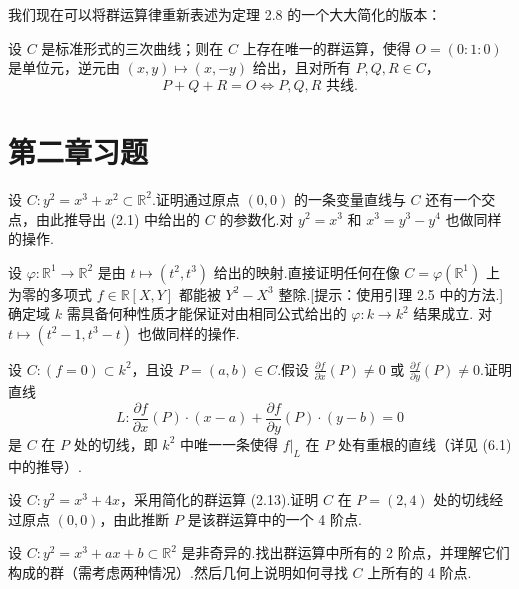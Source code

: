 我们现在可以将群运算律重新表述为定理 2.8 的一个大大简化的版本：

\begin{theorem}
设 \(C\) 是标准形式的三次曲线；则在 \(C\) 上存在唯一的群运算，使得 \(O = (0:1:0)\) 是单位元，逆元由 \((x, y) \mapsto (x, -y)\) 给出，且对所有 \(P, Q, R \in C\)，
\[
P + Q + R = O \iff P, Q, R \text{ 共线.}
\]
\end{theorem}

\section{第二章习题}

\begin{exercise}
设 \(C: y^2 = x^3 + x^2 \subset \mathbb{R}^2\).证明通过原点 \((0,0)\) 的一条变量直线与 \(C\) 还有一个交点，由此推导出 (2.1) 中给出的 \(C\) 的参数化.对 \(y^2 = x^3\) 和 \(x^3 = y^3 - y^4\) 也做同样的操作.
\end{exercise}

\begin{exercise}
设 \(\varphi: \mathbb{R}^1 \to \mathbb{R}^2\) 是由 \(t \mapsto (t^2, t^3)\) 给出的映射.直接证明任何在像 \(C = \varphi(\mathbb{R}^1)\) 上为零的多项式 \(f \in \mathbb{R}[X, Y]\) 都能被 \(Y^2 - X^3\) 整除.[提示：使用引理 2.5 中的方法.] 确定域 \(k\) 需具备何种性质才能保证对由相同公式给出的 \(\varphi: k \to k^2\) 结果成立.
对 \(t \mapsto (t^2 - 1, t^3 - t)\) 也做同样的操作.
\end{exercise}

\begin{exercise}
设 \(C: (f=0) \subset k^2\)，且设 \(P=(a,b) \in C\).假设 \(\frac{\partial f}{\partial x}(P) \neq 0\) 或 \(\frac{\partial f}{\partial y}(P) \neq 0\).证明直线
\[
L: \frac{\partial f}{\partial x}(P) \cdot (x-a) + \frac{\partial f}{\partial y}(P) \cdot (y-b) = 0
\]
是 \(C\) 在 \(P\) 处的切线，即 \(k^2\) 中唯一一条使得 \(f|_L\) 在 \(P\) 处有重根的直线（详见 (6.1) 中的推导）.
\end{exercise}

\begin{exercise}
设 \(C: y^2 = x^3 + 4x\)，采用简化的群运算 (2.13).证明 \(C\) 在 \(P=(2,4)\) 处的切线经过原点 \((0,0)\)，由此推断 \(P\) 是该群运算中的一个 4 阶点.
\end{exercise}

\begin{exercise}
设 \(C: y^2 = x^3 + ax + b \subset \mathbb{R}^2\) 是非奇异的.找出群运算中所有的 2 阶点，并理解它们构成的群（需考虑两种情况）.然后几何上说明如何寻找 \(C\) 上所有的 4 阶点.
\end{exercise}

